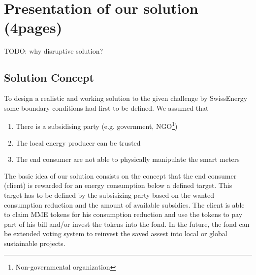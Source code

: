 \documentclass[11pt]{article}
\begin{document}
\section{Presentation of our solution (4pages)}

\color{red} TODO: why disruptive solution? \color{black}
\subsection{Solution Concept}
To design a realistic and working solution to the given challenge by SwissEnergy some boundary conditions had first to be defined. We assumed that
\begin{enumerate}\itemsep0pt
	\item There is a subsidising party (e.g. government, NGO\footnote{Non-governmental organization})
	\item The local energy producer can be trusted
	\item The end consumer are not able to physically manipulate the smart meters
\end{enumerate}
The basic idea of our solution consists on the concept that the end consumer (client) is rewarded for an energy consumption below a defined target. This target has to be defined by the subsisizing party based on the wanted consumption reduction and the amount of available subsidies. The client is able to claim MME tokens for his consumption reduction and use the tokens to pay part of his bill and/or invest the tokens into the fond. In the future, the fond can be extended voting system to reinvest the saved assest into local or global sustainable projects.

\newpage
\end{document}
